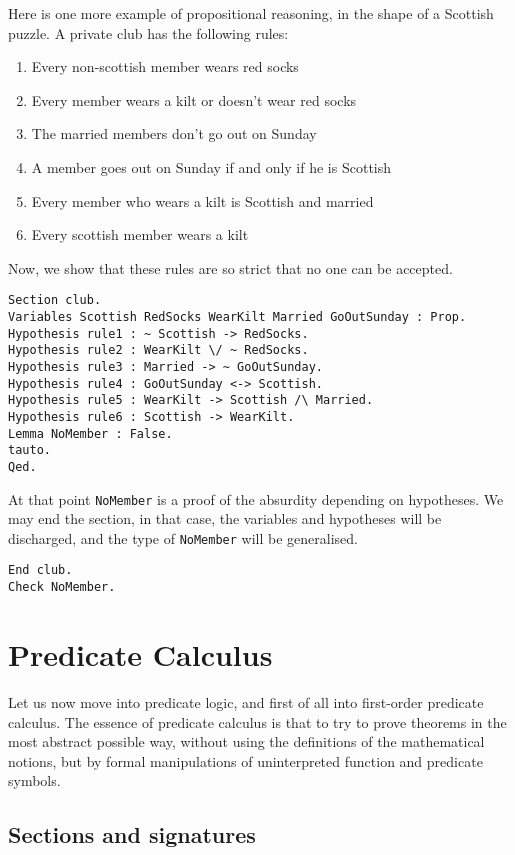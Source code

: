 \documentclass{book}
\begin{document}
Here is one more example of propositional reasoning, in the shape of
a Scottish puzzle. A private club has the following rules:
\begin{enumerate}
\item Every non-scottish member wears red socks
\item Every member wears a kilt or doesn't wear red socks
\item The married members don't go out on Sunday
\item A member goes out on Sunday if and only if he is Scottish
\item Every member who wears a kilt is Scottish and married
\item Every scottish member wears a kilt
\end{enumerate}
Now, we show that these rules are so strict that no one can be accepted.
\begin{lstlisting}
Section club.
Variables Scottish RedSocks WearKilt Married GoOutSunday : Prop.
Hypothesis rule1 : ~ Scottish -> RedSocks.
Hypothesis rule2 : WearKilt \/ ~ RedSocks.
Hypothesis rule3 : Married -> ~ GoOutSunday.
Hypothesis rule4 : GoOutSunday <-> Scottish.
Hypothesis rule5 : WearKilt -> Scottish /\ Married.
Hypothesis rule6 : Scottish -> WearKilt.
Lemma NoMember : False.
tauto.
Qed.
\end{lstlisting}
At that point \verb:NoMember: is a proof of the absurdity depending on
hypotheses.
We may end the section, in that case, the variables and hypotheses
will be discharged, and the type of \verb:NoMember: will be
generalised.

\begin{lstlisting}
End club.
Check NoMember.
\end{lstlisting}

\section{Predicate Calculus}

Let us now move into predicate logic, and first of all into first-order
predicate calculus. The essence of predicate calculus is that to try to prove 
theorems in the most abstract possible way, without using the definitions of 
the mathematical notions, but by formal manipulations of uninterpreted 
function and predicate symbols. 

\subsection{Sections and signatures}
\end{document}
